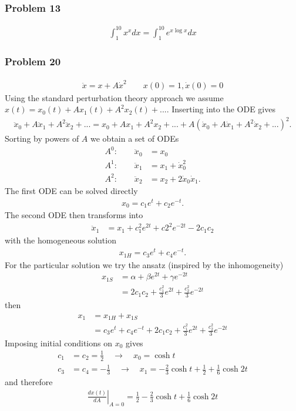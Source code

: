 \documentclass[10pt,a4paper]{article}
\theoremstyle{definition}
\begin{document}
\subsubsection{Problem 13}
\begin{align}
    \int_1^{10} x^x dx=\int_1^{10} e^{x\log x} dx
\end{align}

\subsubsection{Problem 20}
\begin{align}
    \ddot{x}=x+A\dot{x}^2\quad\quad x(0)=1, \dot{x}(0)=0
\end{align}
Using the standard perturbation theory approach we assume $x(t)=x_0(t)+Ax_1(t)+A^2x_2(t)+...$. Inserting into the ODE gives 
\begin{align}
    \ddot{x}_0+A\ddot{x}_1+A^2\ddot{x}_2+...=x_0+Ax_1+A^2x_2+...+A\left(\dot{x}_0+A\dot{x}_1+A^2\dot{x}_2+...\right)^2.
\end{align}
Sorting by powers of $A$ we obtain a set of ODEs
\begin{align}
    A^0:\quad\quad\ddot{x}_0&=x_0\\
    A^1:\quad\quad\ddot{x}_1&=x_1+\dot{x}_0^2\\
    A^2:\quad\quad\ddot{x}_2&=x_2+2\dot{x}_0\dot{x}_1.
\end{align}
The first ODE can be solved directly
\begin{align}
    x_0=c_1e^t+c_2e^{-t}.
\end{align}
The second ODE then transforms into
\begin{align}
    \ddot{x}_1&=x_1+c_1^2e^{2t}+c2^2e^{-2t}-2c_1c_2
\end{align}
with the homogeneous solution
\begin{align}
    x_{1H}=c_3e^t+c_4e^{-t}.
\end{align}
For the particular solution we try the ansatz (inspired by the inhomogeneity) 
\begin{align}
    x_{1S}&=\alpha+\beta e^{2t}+\gamma e^{-2t}\\
    &=2c_1c_2+\frac{c_1^2}{3}e^{2t}+\frac{c_2^2}{3}e^{-2t}
\end{align}
then
\begin{align}
x_1&=x_{1H}+x_{1S}\\
&=c_3e^t+c_4e^{-t}+2c_1c_2+\frac{c_1^2}{3}e^{2t}+\frac{c_2^2}{3}e^{-2t}
\end{align}
Imposing initial conditions on $x_0$ gives
\begin{align}
    c_1&=c_2=\frac{1}{2}\quad\rightarrow\quad x_0=\cosh t\\
    c_3&=c_4=-\frac{1}{3}\quad\rightarrow\quad x_1=-\frac{2}{3}\cosh t+\frac{1}{2}+\frac{1}{6}\cosh 2t
\end{align}
and therefore
\begin{align}
    \left.\frac{dx(t)}{dA}\right|_{A=0}=\frac{1}{2}-\frac{2}{3}\cosh t+\frac{1}{6}\cosh 2t
\end{align}
\end{document}
